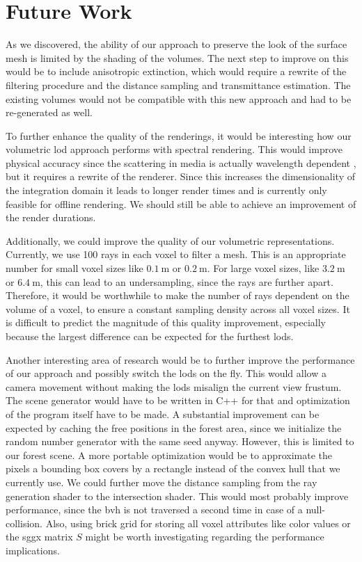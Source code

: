 \chapter{Future Work}
\label{chap:future_work}
As we discovered, the ability of our approach to preserve the look of the surface mesh is limited by the shading of the volumes.
The next step to improve on this would be to include anisotropic extinction, which would require a rewrite of the filtering procedure and the distance sampling and transmittance estimation.
The existing volumes would not be compatible with this new approach and had to be re-generated as well.

To further enhance the quality of the renderings, it would be interesting how our volumetric \ac{lod} approach performs with spectral rendering.
This would improve physical accuracy since the scattering in media is actually wavelength dependent \cite{novak_overview}, but it requires a rewrite of the renderer.
Since this increases the dimensionality of the integration domain it leads to longer render times and is currently only feasible for offline rendering.
We should still be able to achieve an improvement of the render durations.

Additionally, we could improve the quality of our volumetric representations.
Currently, we use 100 rays in each voxel to filter a mesh.
This is an appropriate number for small voxel sizes like $\SI{0.1}{\m}$ or $\SI{0.2}{\m}$.
For large voxel sizes, like $\SI{3.2}{\m}$ or $\SI{6.4}{\m}$, this can lead to an undersampling, since the rays are further apart.
Therefore, it would be worthwhile to make the number of rays dependent on the volume of a voxel, to ensure a constant sampling density across all voxel sizes.
It is difficult to predict the magnitude of this quality improvement, especially because the largest difference can be expected for the furthest \acsp{lod}.

Another interesting area of research would be to further improve the performance of our approach and possibly switch the \acsp{lod} on the fly.
This would allow a camera movement without making the \acsp{lod} misalign the current view frustum.
The scene generator would have to be written in C++ for that and optimization of the program itself have to be made.
A substantial improvement can be expected by caching the free positions in the forest area, since we initialize the random number generator with the same seed anyway.
However, this is limited to our forest scene.
A more portable optimization would be to approximate the pixels a bounding box covers by a rectangle instead of the convex hull that we currently use.
We could further move the distance sampling from the ray generation shader to the intersection shader.
This would most probably improve performance, since the \ac{bvh} is not traversed a second time in case of a null-collision.
Also, using brick grid for storing all voxel attributes like color values or the \ac{sggx} matrix $S$ might be worth investigating regarding the performance implications.

